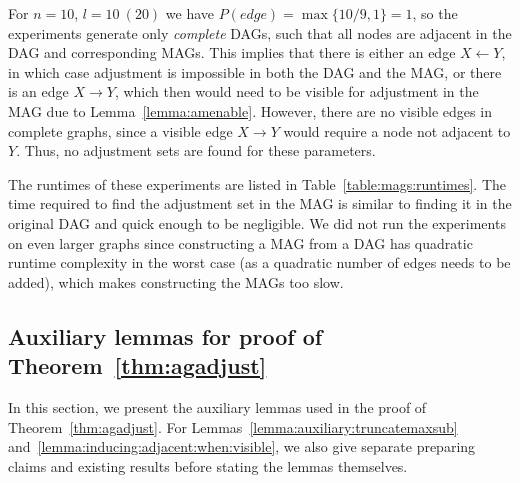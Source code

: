 \begin{newpartinrevision}[r2c7]
For $n=10$, $l=10\ (20)$ we have $P(\textit{edge})=\max\{10/9,1\}=1$, so the experiments generate only \emph{complete} DAGs, such that %
all nodes are adjacent in the DAG and corresponding MAGs.
This implies that there is either an edge $X \gets Y$, in which case adjustment is impossible in both the DAG and the MAG, or there is an edge $X \to Y$, which then would need to be visible for adjustment in the MAG due to Lemma~\ref{lemma:amenable}. However, there are no visible edges in complete graphs, since a visible edge $X\to Y$ would require a node not adjacent to $Y$. Thus, no adjustment sets are found for these parameters. 


The runtimes of these experiments are listed in Table~\ref{table:mags:runtimes}.
The time required to find the adjustment set in the MAG is similar to finding it in 
the original DAG and quick enough to be negligible. We did not run the 
experiments on even larger graphs since constructing a MAG from a DAG
has quadratic runtime complexity in the worst case (as a quadratic number of 
edges needs to be added), which makes constructing the MAGs too slow. 

\end{newpartinrevision}







\color{black}

\subsection{Auxiliary lemmas for proof of Theorem~\ref{thm:agadjust}} %
\label{sec:aux:lemmas}

In this section, we present the auxiliary lemmas used 
in the proof of Theorem~\ref{thm:agadjust}. For Lemmas~\ref{lemma:auxiliary:truncatemaxsub} and~\ref{lemma:inducing:adjacent:when:visible}, we also give separate preparing claims and existing results before stating the lemmas themselves.

